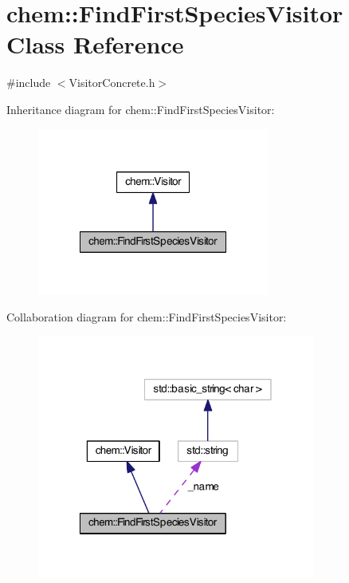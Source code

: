 \hypertarget{classchem_1_1FindFirstSpeciesVisitor}{\section{chem\-:\-:Find\-First\-Species\-Visitor Class Reference}
\label{classchem_1_1FindFirstSpeciesVisitor}
}


{\ttfamily \#include $<$Visitor\-Concrete.\-h$>$}



Inheritance diagram for chem\-:\-:Find\-First\-Species\-Visitor\-:\nopagebreak
\begin{figure}[H]
\begin{center}
\leavevmode
\includegraphics[width=216pt]{classchem_1_1FindFirstSpeciesVisitor__inherit__graph}
\end{center}
\end{figure}


Collaboration diagram for chem\-:\-:Find\-First\-Species\-Visitor\-:\nopagebreak
\begin{figure}[H]
\begin{center}
\leavevmode
\includegraphics[width=259pt]{classchem_1_1FindFirstSpeciesVisitor__coll__graph}
\end{center}
\end{figure}
